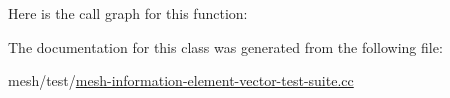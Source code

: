 Here is the call graph for this function\+:




The documentation for this class was generated from the following file\+:\begin{DoxyCompactItemize}
\item 
mesh/test/\hyperlink{mesh-information-element-vector-test-suite_8cc}{mesh-\/information-\/element-\/vector-\/test-\/suite.\+cc}\end{DoxyCompactItemize}
